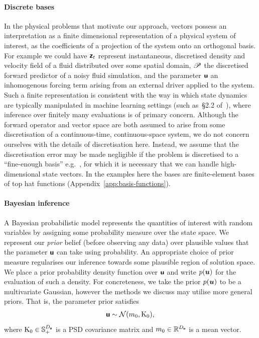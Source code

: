 \documentclass{article}
\theoremstyle{plain}
\theoremstyle{definition}
\theoremstyle{remark}
\begin{document}
\paragraph{Discrete bases} In the physical problems that motivate our approach, vectors possess an interpretation as a finite dimensional representation of a physical system of interest, as the coefficients of a projection of the system onto an orthogonal basis.
For example we could have \(\boldsymbol{\mathsf{z}}_{t}\) represent instantaneous, discretised density and velocity field of a fluid distributed over some spatial domain, \(\mathscr{P}\) the discretised forward predictor of a noisy fluid simulation, and the parameter $\boldsymbol{\mathsf{u}}$ an inhomogenous forcing term arising from an external driver applied to the system.
Such a finite representation is consistent with the way in which state dynamics are typically manipulated in machine learning settings (such as~\S 2.2 of~\citet{RasmussenGaussian2006}), where inference over finitely many evaluations is of primary concern.
Although the forward operator and vector space are both assumed to arise from some discretisation of a continuous-time, continuous-space system, we do not concern ourselves with the details of discretisation here. Instead, we assume that the discretisation error may be made negligible if the problem is discretised to a ``fine-enough basis'' e.g.~\cite{LassasDiscretizationinvariant2009}, for which it is necessary that we can handle high-dimensional state vectors.
In the examples here the bases are finite-element bases of top hat functions (Appendix~\ref{app:basis-functions}).

\paragraph{Bayesian inference} A Bayesian probabilistic model represents the quantities of interest with random variables by assigning some probability measure over the state space.
We represent our \emph{prior} belief (before observing any data) over plausible values that the parameter $\boldsymbol{\mathsf{u}}$ can take using probability.
An appropriate choice of prior measure regularises our inference towards some plausible region of solution space.
We place a prior probability density function over $\boldsymbol{\mathsf{u}}$ and write $p(\boldsymbol{u})$ for the evaluation of such a density.
For concreteness, we take the prior $p(\boldsymbol{u})$ to be a multivariate Gaussian, however the methods we discuss may utilise more general priors.
That is, the parameter prior satisfies
\begin{align*}
\boldsymbol{\mathsf{u}} \sim \mathcal{N}(m_0,\mathrm{K}_0),
\end{align*}
where $\mathrm{K}_0 \in \mathbb{S}^{D_{\boldsymbol{\mathsf{u}}}}_+$ is a PSD covariance matrix and $m_0 \in \mathbb{R}^{D_{\boldsymbol{\mathsf{u}}}}$ is a mean vector.
\end{document}
